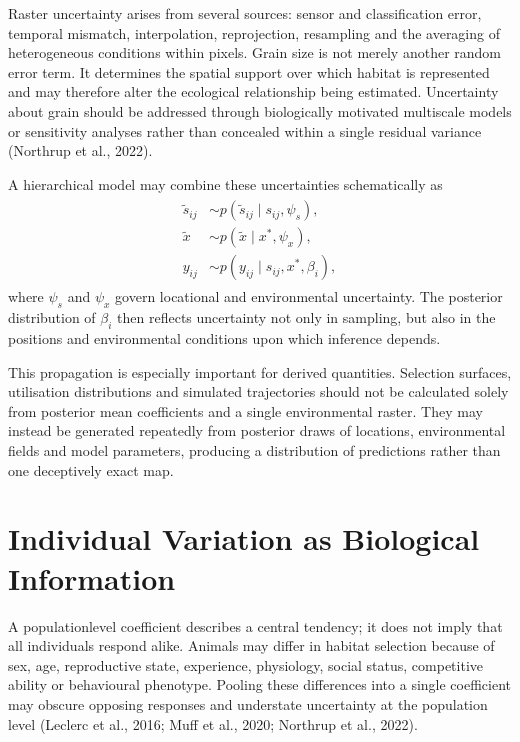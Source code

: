 \documentclass[letterpaper,10pt,english]{sphinxmanual}
\begin{document}
\sphinxAtStartPar
Raster uncertainty arises from several sources: sensor and classification error, temporal mismatch, interpolation, reprojection, resampling and the averaging of heterogeneous conditions within pixels. Grain size is not merely another random error term. It determines the spatial support over which habitat is represented and may therefore alter the ecological relationship being estimated. Uncertainty about grain should be addressed through biologically motivated multiscale models or sensitivity analyses rather than concealed within a single residual variance (Northrup et al., 2022).

\sphinxAtStartPar
A hierarchical model may combine these uncertainties schematically as
\begin{equation*}
\begin{split}
\begin{aligned}
\tilde{s}_{ij}
&\sim
p\left(
\tilde{s}_{ij}\mid s_{ij},\psi_s
\right),\\
\tilde{x}
&\sim
p\left(
\tilde{x}\mid x^{*},\psi_x
\right),\\
y_{ij}
&\sim
p\left(
y_{ij}\mid s_{ij},x^{*},\beta_i
\right),
\end{aligned}
\end{split}
\end{equation*}
\sphinxAtStartPar
where \(\psi_s\) and \(\psi_x\) govern locational and environmental uncertainty. The posterior distribution of \(\beta_i\) then reflects uncertainty not only in sampling, but also in the positions and environmental conditions upon which inference depends.

\sphinxAtStartPar
This propagation is especially important for derived quantities. Selection surfaces, utilisation distributions and simulated trajectories should not be calculated solely from posterior mean coefficients and a single environmental raster. They may instead be generated repeatedly from posterior draws of locations, environmental fields and model parameters, producing a distribution of predictions rather than one deceptively exact map.


\section{Individual Variation as Biological Information}
\label{\detokenize{theory:individual-variation-as-biological-information}}
\sphinxAtStartPar
A population\sphinxhyphen{}level coefficient describes a central tendency; it does not imply that all individuals respond alike. Animals may differ in habitat selection because of sex, age, reproductive state, experience, physiology, social status, competitive ability or behavioural phenotype. Pooling these differences into a single coefficient may obscure opposing responses and understate uncertainty at the population level (Leclerc et al., 2016; Muff et al., 2020; Northrup et al., 2022).
\end{document}

